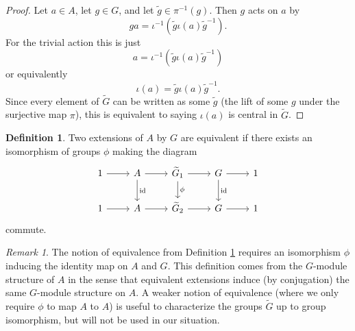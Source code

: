 \documentclass{dcthesis}
\newcommand{\defi}[1]{\textsf{#1}}
\newcommand{\wt}[1]{\widetilde{#1}}
\DeclareMathOperator{\id}{id}
\theoremstyle{definition}
\newtheorem{definition}[prop]{Definition}
\theoremstyle{remark}
\newtheorem{remark}[prop]{Remark}
\numberwithin{equation}{section}
\numberwithin{figure}{section}
\begin{document}
{{\begin{proof}
      Let $a\in A$, let $g\in G$,
      and let $\wt{g}\in\pi^{-1}(g)$.
      Then $g$ acts on $a$ by
      \begin{equation}
        \label{eqn:gaction}
        ga=\iota^{-1}\left(\wt{g}\iota(a){\wt{g}}^{-1}\right).
      \end{equation}
      For the trivial action this is just
      \begin{equation}
        \label{eqn:gactiontrivial1}
        a=\iota^{-1}\left(\wt{g}\iota(a)\wt{g}^{-1}\right)
      \end{equation}
      or equivalently
      \begin{equation}
        \label{eqn:gactiontrivial2}
        \iota(a)=\wt{g}\iota(a)\wt{g}^{-1}.
      \end{equation}
      Since every element of $\wt{G}$ can be written as some
      $\wt{g}$ (the lift of some $g$ under the surjective map $\pi$),
      this is equivalent to saying $\iota(a)$
      is central in $\wt{G}$.
    \end{proof}
    \begin{definition}
      \label{def:equivalentgroupextension}
      Two extensions of $A$ by $G$ are
      \defi{equivalent}
      if there exists an isomorphism of groups
      $\phi$ making the diagram
      \begin{equation}
        \label{eqn:twoextensions}
        \begin{tikzcd}
          1\arrow{r}&A\arrow{d}{\id}\arrow{r}{}&\wt{G}_1\arrow{r}{}\arrow{d}{\phi}&G\arrow{d}{\id}\arrow{r}&1\\
          1\arrow{r}&A\arrow{r}{}&\wt{G}_2\arrow{r}{}&G\arrow{r}&1
        \end{tikzcd}
      \end{equation}
      commute.
    \end{definition}
    \begin{remark}
      \label{rmk:otherequivalences}
      The notion of equivalence from
      Definition \ref{def:equivalentgroupextension}
      requires an isomorphism $\phi$
      inducing the identity map on $A$ and $G$.
      This definition comes from the $G$-module structure of $A$
      in the sense that equivalent extensions
      induce (by conjugation) the same $G$-module structure on $A$.
      A weaker notion of equivalence
      (where we only require $\phi$
      to map $A$ to $A$)
      is useful to characterize
      the groups $\wt{G}$ up to group isomorphism,
      but will not be used in our situation.
    \end{remark}
}}
\end{document}
